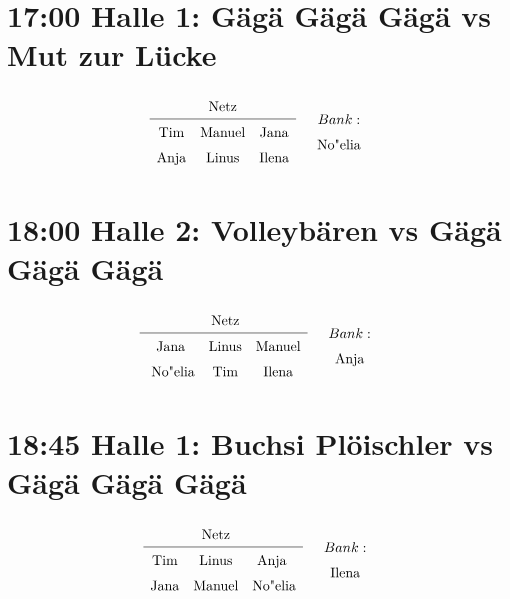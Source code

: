 \documentclass[DIN, pagenumber=false, fontsize=11pt, parskip=half]{scrartcl}
\begin{document}
\section*{17:00 Halle 1: Gägä Gägä Gägä vs Mut zur Lücke}
\[
    \begin{array}{cc}
\renewcommand{\arraystretch}{1.5}
\begin{array}{ccc}
& \text{Netz} & \\    
\hline
\text{Tim} & \text{Manuel} & \text{Jana} \\
\text{Anja} & \text{Linus} & \text{Ilena} \\
\end{array} & \begin{array}{c}Bank: \\ \text{No"elia}\end{array}
\end{array}
\]
\section*{18:00 Halle 2: Volleybären vs Gägä Gägä Gägä}
\[
    \begin{array}{cc}
\renewcommand{\arraystretch}{1.5}
\begin{array}{ccc}
& \text{Netz} & \\    
\hline
\text{Jana} & \text{Linus} & \text{Manuel} \\
\text{ No"elia} & \text{Tim} & \text{Ilena} \\
\end{array} & \begin{array}{c}Bank: \\ \text{Anja}\end{array}
\end{array}
\]
\section*{18:45 Halle 1: Buchsi Plöischler vs Gägä Gägä Gägä}
\[
    \begin{array}{cc}
\renewcommand{\arraystretch}{1.5}
\begin{array}{ccc}
& \text{Netz} & \\    
\hline
\text{Tim} & \text{Linus} & \text{Anja } \\
\text{Jana} & \text{Manuel} & \text{No"elia} \\
\end{array} & \begin{array}{c}Bank: \\ \text{Ilena}\end{array}
\end{array}
\]
\end{document}
